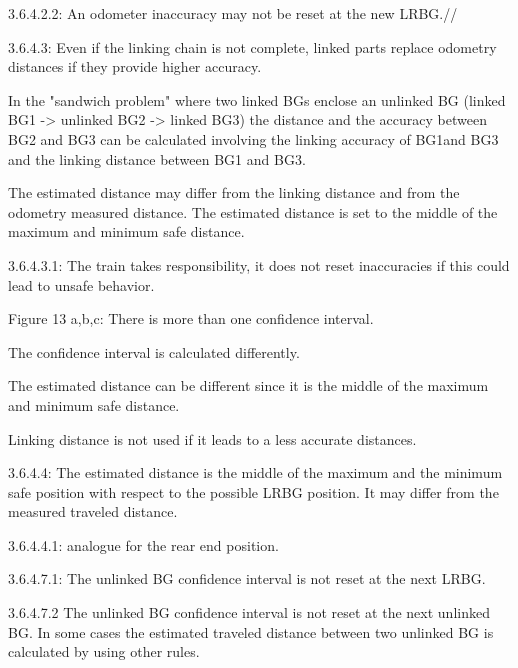 3.6.4.2.2: An odometer inaccuracy may not be reset at the new LRBG.//

3.6.4.3: Even if the linking chain is not complete, linked parts replace odometry distances if they provide higher accuracy.

In the "sandwich problem" where two linked BGs enclose an unlinked BG 
(linked BG1 -> unlinked BG2 -> linked BG3) 
the distance and the accuracy between BG2 and BG3 can be calculated involving the linking accuracy of BG1and BG3 and the linking distance between BG1 and BG3. 

The estimated distance may differ from the linking distance and from the odometry measured distance. The estimated distance is set to the middle of the maximum and minimum safe distance.

3.6.4.3.1:
The train takes responsibility, it does not reset inaccuracies if this could lead to unsafe behavior. 

Figure 13 a,b,c:
There is more than one confidence interval.

The confidence interval is calculated differently.

The estimated distance can be different since it is the middle of the maximum and minimum safe distance.

Linking distance is not used if it leads to a less accurate distances.

3.6.4.4:
The estimated distance is the middle of the maximum and the minimum safe position with respect to the possible LRBG position. It may differ from the measured traveled distance.

3.6.4.4.1:
analogue for the rear end position.

3.6.4.7.1:
The unlinked BG confidence interval is not reset at the next LRBG.

3.6.4.7.2
The unlinked BG confidence interval is not reset at the next unlinked BG. In some cases the estimated traveled distance between two unlinked BG is calculated by using other rules.
